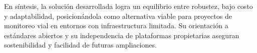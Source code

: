 En síntesis, la solución desarrollada logra un equilibrio entre robustez, bajo costo y adaptabilidad, posicionándola como alternativa viable para proyectos de monitoreo vial en entornos con infraestructura limitada. Su orientación a estándares abiertos y su independencia de plataformas propietarias aseguran sostenibilidad y facilidad de futuras ampliaciones.



